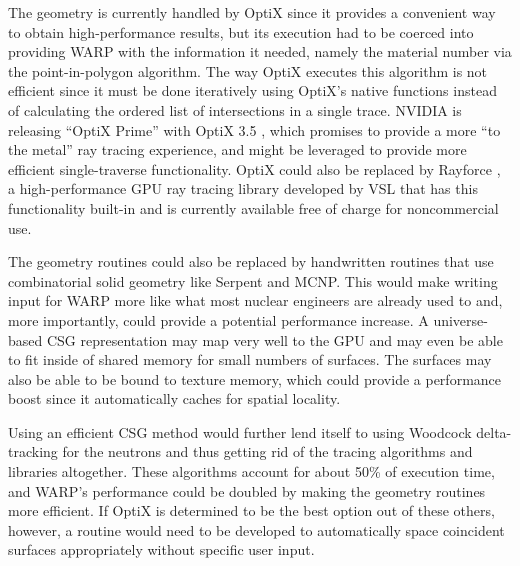 \documentclass[preprint,12pt]{elsarticle}
\begin{document}
The geometry is currently handled by OptiX since it provides a convenient way to obtain high-performance results, but its execution had to be coerced into providing WARP with the information it needed, namely the material number via the point-in-polygon algorithm.  The way OptiX executes this algorithm is not efficient since it must be done iteratively using OptiX's native functions instead of calculating the ordered list of intersections in a single trace.  NVIDIA is releasing ``OptiX Prime'' with OptiX 3.5 \cite{optix3.5}, which promises to provide a more ``to the metal'' ray tracing experience, and might be leveraged to provide more efficient single-traverse functionality.  OptiX could also be replaced by Rayforce \cite{rayforce}, a high-performance GPU ray tracing library developed by VSL that has this functionality built-in and is currently available free of charge for noncommercial use.

The geometry routines could also be replaced by handwritten routines that use combinatorial solid geometry like Serpent and MCNP.  This would make writing input for WARP more like what most nuclear engineers are already used to and, more importantly, could provide a potential performance increase.  A universe-based CSG representation may map very well to the GPU and may even be able to fit inside of shared memory for small numbers of surfaces.  The surfaces may also be able to be bound to texture memory, which could provide a performance boost since it automatically caches for spatial locality.  

Using an efficient CSG method would further lend itself to using Woodcock delta-tracking for the neutrons and thus getting rid of the tracing algorithms and libraries altogether.  These algorithms account for about 50\% of execution time, and WARP's performance could be doubled by making the geometry routines more efficient.  If OptiX is determined to be the best option out of these others, however, a routine would need to be developed to automatically space coincident surfaces appropriately without specific user input.
\end{document}
